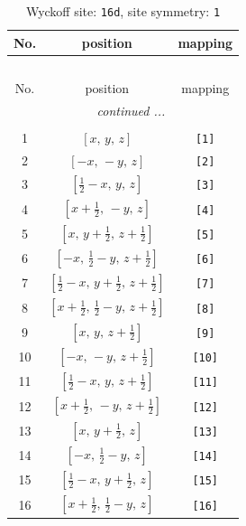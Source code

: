 \documentclass[fleqn,8pt]{jsarticle}
\begin{document}
\begin{longtable}{ccc}
\caption{Wyckoff site: {\tt 16d}, site symmetry: {\tt 1}}
 \\
 \hline \hline
No. & position & mapping \\ \hline \endfirsthead

\multicolumn{2}{l}{\tablename\ \thetable{}} \\
 \hline \hline
No. & position & mapping \\ \hline \endhead

 \hline \hline
\multicolumn{2}{r}{\footnotesize\it continued ...} \\ \endfoot

 \hline \hline
\multicolumn{2}{r}{} \\ \endlastfoot

1 & $\left[ x,\, y,\, z \right]$ & {\tt [1]} \\ \hline
2 & $\left[ - x,\, - y,\, z \right]$ & {\tt [2]} \\ \hline
3 & $\left[ \frac{1}{2} - x,\, y,\, z \right]$ & {\tt [3]} \\ \hline
4 & $\left[ x + \frac{1}{2},\, - y,\, z \right]$ & {\tt [4]} \\ \hline
5 & $\left[ x,\, y + \frac{1}{2},\, z + \frac{1}{2} \right]$ & {\tt [5]} \\ \hline
6 & $\left[ - x,\, \frac{1}{2} - y,\, z + \frac{1}{2} \right]$ & {\tt [6]} \\ \hline
7 & $\left[ \frac{1}{2} - x,\, y + \frac{1}{2},\, z + \frac{1}{2} \right]$ & {\tt [7]} \\ \hline
8 & $\left[ x + \frac{1}{2},\, \frac{1}{2} - y,\, z + \frac{1}{2} \right]$ & {\tt [8]} \\ \hline
9 & $\left[ x,\, y,\, z + \frac{1}{2} \right]$ & {\tt [9]} \\ \hline
10 & $\left[ - x,\, - y,\, z + \frac{1}{2} \right]$ & {\tt [10]} \\ \hline
11 & $\left[ \frac{1}{2} - x,\, y,\, z + \frac{1}{2} \right]$ & {\tt [11]} \\ \hline
12 & $\left[ x + \frac{1}{2},\, - y,\, z + \frac{1}{2} \right]$ & {\tt [12]} \\ \hline
13 & $\left[ x,\, y + \frac{1}{2},\, z \right]$ & {\tt [13]} \\ \hline
14 & $\left[ - x,\, \frac{1}{2} - y,\, z \right]$ & {\tt [14]} \\ \hline
15 & $\left[ \frac{1}{2} - x,\, y + \frac{1}{2},\, z \right]$ & {\tt [15]} \\ \hline
16 & $\left[ x + \frac{1}{2},\, \frac{1}{2} - y,\, z \right]$ & {\tt [16]} \\
\end{longtable}
\end{document}
